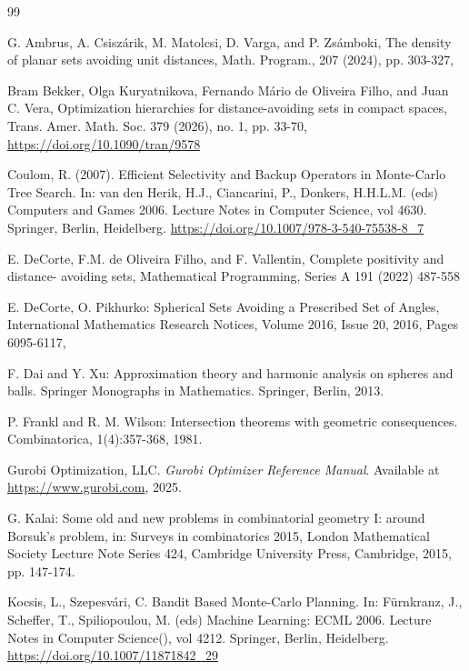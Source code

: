 \documentclass[11pt]{amsart}
\numberwithin{equation}{section}
\begin{document}
\begin{thebibliography}{99}

 G. Ambrus, A. Csisz\'arik, M. Matolcsi, D. Varga, and P. Zs\'amboki, The density of
planar sets avoiding unit distances, Math. Program., 207 (2024), pp. 303-327,

Bram Bekker, Olga Kuryatnikova, Fernando Mário de Oliveira Filho, and Juan C. Vera,
Optimization hierarchies for distance-avoiding sets in compact spaces, Trans. Amer. Math. Soc. 379 (2026), no. 1, pp. 33-70, \url{https://doi.org/10.1090/tran/9578}

Coulom, R. (2007). Efficient Selectivity and Backup Operators in Monte-Carlo Tree Search. In: van den Herik, H.J., Ciancarini, P., Donkers, H.H.L.M. (eds) Computers and Games 2006. Lecture Notes in Computer Science, vol 4630. Springer, Berlin, Heidelberg. \url{https://doi.org/10.1007/978-3-540-75538-8_7}

E. DeCorte, F.M. de Oliveira Filho, and F. Vallentin, Complete positivity and distance-
avoiding sets, Mathematical Programming, Series A 191 (2022) 487-558

E. DeCorte, O. Pikhurko: Spherical Sets Avoiding a Prescribed Set of Angles, 
International Mathematics Research Notices, Volume 2016, Issue 20, 2016, Pages 6095-6117,

F. Dai and Y. Xu: Approximation theory and harmonic analysis on spheres and balls. Springer Monographs in Mathematics. Springer, Berlin, 2013.

P. Frankl and R. M. Wilson: Intersection theorems with geometric consequences. Combinatorica, 1(4):357-368, 1981.

Gurobi Optimization, LLC.
\newblock \emph{Gurobi Optimizer Reference Manual}.
\newblock Available at \url{https://www.gurobi.com}, 2025.

G. Kalai: Some old and new problems in combinatorial geometry I: around Borsuk’s problem,
in: Surveys in combinatorics 2015, London Mathematical Society Lecture Note Series 424,
Cambridge University Press, Cambridge, 2015, pp. 147-174.

Kocsis, L., Szepesvári, C. Bandit Based Monte-Carlo Planning. In: Fürnkranz, J., Scheffer, T., Spiliopoulou, M. (eds) Machine Learning: ECML 2006. Lecture Notes in Computer Science(), vol 4212. Springer, Berlin, Heidelberg. \url{https://doi.org/10.1007/11871842_29}


\end{thebibliography}
\end{document}
